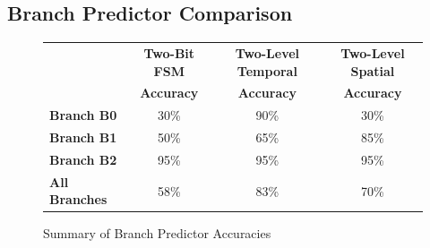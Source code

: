 \documentclass[10pt]{article}
\begin{document}
\subsection{Branch Predictor Comparison}

\begin{figure}[H]
\centering
{\setlength{\tabcolsep}{3pt}
\begin{tabular}{lccc}
\hline
& \textbf{Two-Bit FSM} & \textbf{Two-Level Temporal} & \textbf{Two-Level Spatial} \\
& \textbf{Accuracy} & \textbf{Accuracy} & \textbf{Accuracy} \\ \hline
\textbf{Branch B0}    & 30\%& 90\%& 30\%\\ \hline
\textbf{Branch B1}    & 50\%& 65\%& 85\%\\ \hline
\textbf{Branch B2}    & 95\%& 95\%& 95\%\\ \hline
\textbf{All Branches} & 58\%& 83\%& 70\%\\ \hline
\end{tabular}
}
\caption{Summary of Branch Predictor Accuracies}
\end{figure}
\end{document}
